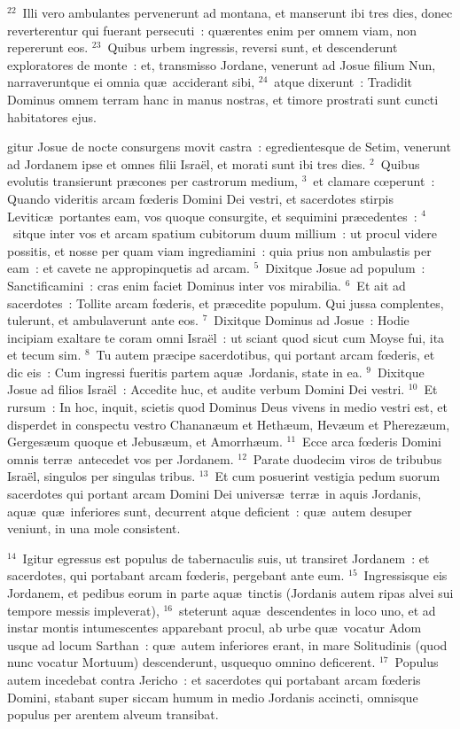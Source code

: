 ${}^{22}$~Illi vero ambulantes pervenerunt ad montana, et manserunt ibi tres dies, donec reverterentur qui fuerant persecuti~: qu\ae rentes enim per omnem viam, non repererunt eos.
${}^{23}$~Quibus urbem ingressis, reversi sunt, et descenderunt exploratores de monte~: et, transmisso Jordane, venerunt ad Josue filium Nun, narraveruntque ei omnia qu\ae\ acciderant sibi,
${}^{24}$~atque dixerunt~: Tradidit Dominus omnem terram hanc in manus nostras, et timore prostrati sunt cuncti habitatores ejus.

\bchapter
{}gitur Josue de nocte consurgens movit castra~: egredientesque de Setim, venerunt ad Jordanem ipse et omnes filii Isra\"el, et morati sunt ibi tres dies.
${}^{2}$~Quibus evolutis transierunt pr\ae cones per castrorum medium,
${}^{3}$~et clamare cœperunt~: Quando videritis arcam fœderis Domini Dei vestri, et sacerdotes stirpis Levitic\ae\ portantes eam, vos quoque consurgite, et sequimini pr\ae cedentes~:
${}^{4}$~sitque inter vos et arcam spatium cubitorum duum millium~: ut procul videre possitis, et nosse per quam viam ingrediamini~: quia prius non ambulastis per eam~: et cavete ne appropinquetis ad arcam.
${}^{5}$~Dixitque Josue ad populum~: Sanctificamini~: cras enim faciet Dominus inter vos mirabilia.
${}^{6}$~Et ait ad sacerdotes~: Tollite arcam fœderis, et pr\ae cedite populum. Qui jussa complentes, tulerunt, et ambulaverunt ante eos.
${}^{7}$~Dixitque Dominus ad Josue~: Hodie incipiam exaltare te coram omni Isra\"el~: ut sciant quod sicut cum Moyse fui, ita et tecum sim.
${}^{8}$~Tu autem pr\ae cipe sacerdotibus, qui portant arcam fœderis, et dic eis~: Cum ingressi fueritis partem aqu\ae\ Jordanis, state in ea.
${}^{9}$~Dixitque Josue ad filios Isra\"el~: Accedite huc, et audite verbum Domini Dei vestri.
${}^{10}$~Et rursum~: In hoc, inquit, scietis quod Dominus Deus vivens in medio vestri est, et disperdet in conspectu vestro Chanan\ae um et Heth\ae um, Hev\ae um et Pherez\ae um, Gerges\ae um quoque et Jebus\ae um, et Amorrh\ae um.
${}^{11}$~Ecce arca fœderis Domini omnis terr\ae\ antecedet vos per Jordanem.
${}^{12}$~Parate duodecim viros de tribubus Isra\"el, singulos per singulas tribus.
${}^{13}$~Et cum posuerint vestigia pedum suorum sacerdotes qui portant arcam Domini Dei univers\ae\ terr\ae\ in aquis Jordanis, aqu\ae\ qu\ae\ inferiores sunt, decurrent atque deficient~: qu\ae\ autem desuper veniunt, in una mole consistent.


${}^{14}$~Igitur egressus est populus de tabernaculis suis, ut transiret Jordanem~: et sacerdotes, qui portabant arcam fœderis, pergebant ante eum.
${}^{15}$~Ingressisque eis Jordanem, et pedibus eorum in parte aqu\ae\ tinctis (Jordanis autem ripas alvei sui tempore messis impleverat),
${}^{16}$~steterunt aqu\ae\ descendentes in loco uno, et ad instar montis intumescentes apparebant procul, ab urbe qu\ae\ vocatur Adom usque ad locum Sarthan~: qu\ae\ autem inferiores erant, in mare Solitudinis (quod nunc vocatur Mortuum) descenderunt, usquequo omnino deficerent.
${}^{17}$~Populus autem incedebat contra Jericho~: et sacerdotes qui portabant arcam fœderis Domini, stabant super siccam humum in medio Jordanis accincti, omnisque populus per arentem alveum transibat.

